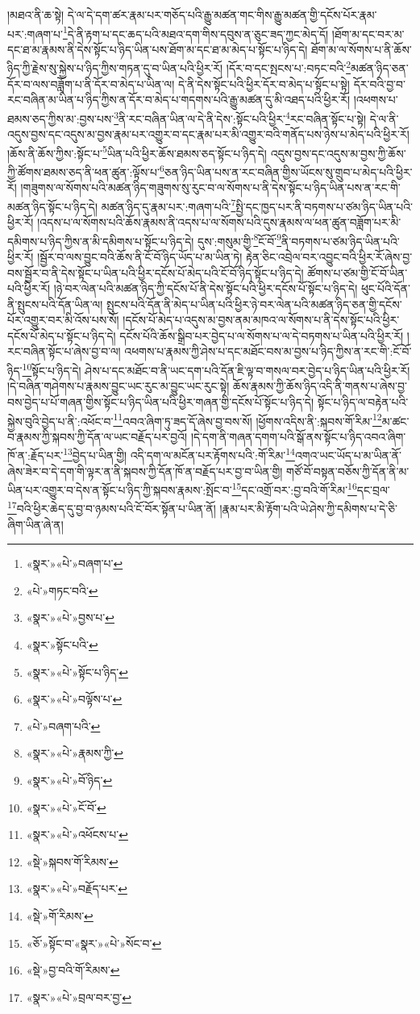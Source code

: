 །མཐའ་ནི་ཆ་སྟེ། དེ་ལ་དེ་དག་ཚར་རྣམ་པར་གཅོད་པའི་རྒྱུ་མཚན་གང་གིས་རྒྱུ་མཚན་གྱི་དངོས་པོར་རྣམ་པར་:གཞག་པ་\footnote{«སྣར་»«པེ་»བཞག་པ་}དེ་ནི་རྟག་པ་དང་ཆད་པའི་མཐའ་དག་གིས་དབུས་ན་ཅུང་ཟད་ཀྱང་མེད་དོ། །ཐོག་མ་དང་བར་མ་དང་ཐ་མ་རྣམས་ནི་དེས་སྟོང་པ་ཉིད་ཡིན་པས་ཐོག་མ་དང་ཐ་མ་མེད་པ་སྟོང་པ་ཉིད་དེ། ཐོག་མ་ལ་སོགས་པ་ནི་ཆོས་ཉིད་ཀྱི་རྗེས་སུ་སྐྱེས་པ་ཉིད་ཀྱིས་གཏན་དུ་བ་ཡིན་པའི་ཕྱིར་རོ། །དོར་བ་དང་སྤངས་པ་:བཏང་བའི་\footnote{«པེ་»གཏང་བའི་}མཚན་ཉིད་ཅན་དོར་བ་ལས་བཟློག་པ་ནི་དོར་བ་མེད་པ་ཡིན་ལ། དེ་ནི་དེས་སྟོང་པའི་ཕྱིར་དོར་བ་མེད་པ་སྟོང་པ་སྟེ། དོར་བའི་བྱ་བ་རང་བཞིན་མ་ཡིན་པ་ཉིད་ཀྱིས་ན་དོར་བ་མེད་པ་གདགས་པའི་རྒྱུ་མཚན་དུ་མི་འཐད་པའི་ཕྱིར་རོ། །འཕགས་པ་ཐམས་ཅད་ཀྱིས་མ་:བྱས་པས་\footnote{«སྣར་»«པེ་»བྱས་པ་}ནི་རང་བཞིན་ཡིན་ལ་དེ་ནི་དེས་:སྟོང་པའི་ཕྱིར་\footnote{«སྣར་»སྟོང་པའི་}རང་བཞིན་སྟོང་པ་སྟེ། དེ་ལ་ནི་འདུས་བྱས་དང་འདུས་མ་བྱས་རྣམ་པར་འགྱུར་བ་དང་རྣམ་པར་མི་འགྱུར་བའི་གནོད་པས་ཉེས་པ་མེད་པའི་ཕྱིར་རོ། །ཆོས་ནི་ཆོས་ཀྱིས་:སྟོང་པ་\footnote{«སྣར་»«པེ་»སྟོང་པ་ཉིད་}ཡིན་པའི་ཕྱིར་ཆོས་ཐམས་ཅད་སྟོང་པ་ཉིད་དེ། འདུས་བྱས་དང་འདུས་མ་བྱས་ཀྱི་ཆོས་ཀྱི་ཚོགས་ཐམས་ཅད་ནི་ཕན་ཚུན་:ལྟོས་པ་\footnote{«སྣར་»«པེ་»བལྟོས་པ་}ཅན་ཉིད་ཡིན་པས་ན་རང་བཞིན་གྱིས་ཡོངས་སུ་གྲུབ་པ་མེད་པའི་ཕྱིར་རོ། །གཟུགས་ལ་སོགས་པའི་མཚན་ཉིད་གཟུགས་སུ་རུང་བ་ལ་སོགས་པ་ནི་དེས་སྟོང་པ་ཉིད་ཡིན་པས་ན་རང་གི་མཚན་ཉིད་སྟོང་པ་ཉིད་དེ། མཚན་ཉིད་དུ་རྣམ་པར་:གཞག་པའི་\footnote{«པེ་»བཞག་པའི་}སྤྱི་དང་ཁྱད་པར་ནི་བཏགས་པ་ཙམ་ཉིད་ཡིན་པའི་ཕྱིར་རོ། །འདས་པ་ལ་སོགས་པའི་ཆོས་རྣམས་ནི་འདས་པ་ལ་སོགས་པའི་དུས་རྣམས་ལ་ཕན་ཚུན་བཟློག་པར་མི་དམིགས་པ་ཉིད་ཀྱིས་ན་མི་དམིགས་པ་སྟོང་པ་ཉིད་དེ། དུས་:གསུམ་གྱི་\footnote{«སྣར་»«པེ་»རྣམས་ཀྱི་}ངོ་བོ་\footnote{«སྣར་»«པེ་»བོ་ཉིད་}ནི་བཏགས་པ་ཙམ་ཉིད་ཡིན་པའི་ཕྱིར་རོ། །སྦྱོར་བ་ལས་བྱུང་བའི་ཆོས་ནི་ངོ་བོ་ཉིད་ཡོད་པ་མ་ཡིན་ཏེ། རྟེན་ཅིང་འབྲེལ་བར་འབྱུང་བའི་ཕྱིར་རོ་ཞེས་བྱ་བས་སྦྱོར་བ་ནི་དེས་སྟོང་པ་ཡིན་པའི་ཕྱིར་དངོས་པོ་མེད་པའི་ངོ་བོ་ཉིད་སྟོང་པ་ཉིད་དེ། ཚོགས་པ་ཙམ་གྱི་ངོ་བོ་ཡིན་པའི་ཕྱིར་རོ། །ཉེ་བར་ལེན་པའི་མཚན་ཉིད་ཀྱི་དངོས་པོ་ནི་དེས་སྟོང་པའི་ཕྱིར་དངོས་པོ་སྟོང་པ་ཉིད་དེ། ཕུང་པོའི་དོན་ནི་སྤུངས་པའི་དོན་ཡིན་ལ། སྤུངས་པའི་དོན་ནི་མེད་པ་ཡིན་པའི་ཕྱིར་ཉེ་བར་ལེན་པའི་མཚན་ཉིད་ཅན་གྱི་དངོས་པོར་འགྱུར་བར་མི་འོས་པས་སོ། །དངོས་པོ་མེད་པ་འདུས་མ་བྱས་ནམ་མཁའ་ལ་སོགས་པ་ནི་དེས་སྟོང་པའི་ཕྱིར་དངོས་པོ་མེད་པ་སྟོང་པ་ཉིད་དེ། དངོས་པོའི་ཆོས་སྒྲིབ་པར་བྱེད་པ་ལ་སོགས་པ་ལ་དེ་བཏགས་པ་ཡིན་པའི་ཕྱིར་རོ། །རང་བཞིན་སྟོང་པ་ཞེས་བྱ་བ་ལ། འཕགས་པ་རྣམས་ཀྱི་ཤེས་པ་དང་མཐོང་བས་མ་བྱས་པ་ཉིད་ཀྱིས་ན་རང་གི་:ངོ་བོ་ཉིད་\footnote{«སྣར་»«པེ་»ངོ་བོ་}སྟོང་པ་ཉིད་དེ། ཤེས་པ་དང་མཐོང་བ་ནི་ཡང་དག་པའི་དོན་ཇི་ལྟ་བ་གསལ་བར་བྱེད་པ་ཉིད་ཡིན་པའི་ཕྱིར་རོ། །དེ་བཞིན་གཤེགས་པ་རྣམས་བྱུང་ཡང་རུང་མ་བྱུང་ཡང་རུང་སྟེ། ཆོས་རྣམས་ཀྱི་ཆོས་ཉིད་འདི་ནི་གནས་པ་ཞེས་བྱ་བས་བྱེད་པ་པོ་གཞན་གྱིས་སྟོང་པ་ཉིད་ཡིན་པའི་ཕྱིར་གཞན་གྱི་དངོས་པོ་སྟོང་པ་ཉིད་དེ། སྟོང་པ་ཉིད་ལ་བརྟེན་པའི་སྐྱེས་བུའི་བྱེད་པ་ནི་:འཕོང་བ་\footnote{«སྣར་»«པེ་»འཕོངས་པ་}འབའ་ཞིག་ཏུ་ཟད་དོ་ཞེས་བྱ་བས་སོ། །ཕྱོགས་འདིས་ནི་:སྐབས་གོ་རིམ་\footnote{«སྡེ་»སྐབས་གོ་རིམས་}མ་ཚང་བ་རྣམས་ཀྱི་སྐབས་ཀྱི་དོན་ལ་ཡང་བརྗོད་པར་བྱའོ། །དེ་དག་ནི་གཞན་དགག་པའི་སྒོ་ནས་སྟོང་པ་ཉིད་འབའ་ཞིག་ཁོ་ན་:རྗོད་པར་\footnote{«སྣར་»«པེ་»བརྗོད་པར་}བྱེད་པ་ཡིན་གྱི། འདི་དག་ལ་མངོན་པར་རྟོགས་པའི་:གོ་རིམ་\footnote{«སྡེ་»གོ་རིམས་}འགའ་ཡང་ཡོད་པ་མ་ཡིན་ནོ་ཞེས་ཟེར་བ་དེ་དག་གི་ལྟར་ན་ནི་སྐབས་ཀྱི་དོན་ཁོ་ན་བརྗོད་པར་བྱ་བ་ཡིན་གྱི། གཙོ་བོ་བསྟན་བཅོས་ཀྱི་དོན་ནི་མ་ཡིན་པར་འགྱུར་བ་དེས་ན་སྟོང་པ་ཉིད་ཀྱི་སྐབས་རྣམས་:སྤོང་བ་\footnote{«ཅོ་»སྟོང་བ་«སྣར་»«པེ་»སོང་བ་}དང་འགྲོ་བར་:བྱ་བའི་གོ་རིམ་\footnote{«སྡེ་»བྱ་བའི་གོ་རིམས་}དང་བྲལ་\footnote{«སྣར་»«པེ་»བྲལ་བར་བྱ་}བའི་ཕྱིར་ཆེད་དུ་བྱ་བ་ཉམས་པའི་ངོ་བོར་སྟོན་པ་ཡིན་ནོ། །རྣམ་པར་མི་རྟོག་པའི་ཡེ་ཤེས་ཀྱི་དམིགས་པ་དེ་ཅི་ཞིག་ཡིན་ཞེ་ན། 